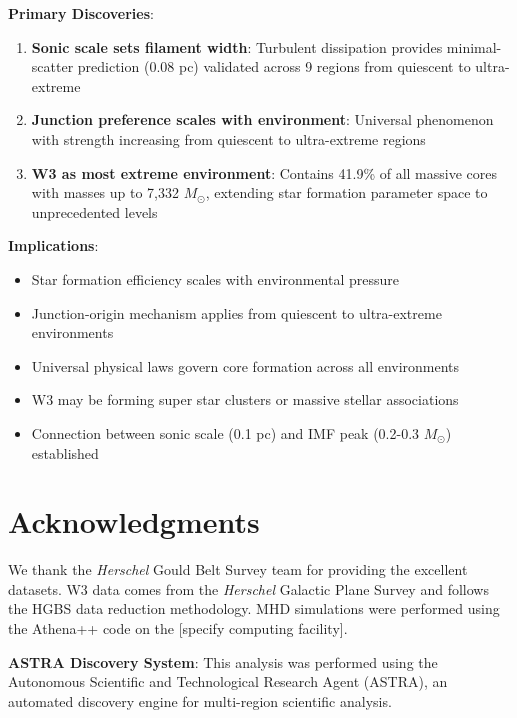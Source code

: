 \documentclass[11pt,a4paper]{article}
\begin{document}
\textbf{Primary Discoveries}:
\begin{enumerate}
    \item \textbf{Sonic scale sets filament width}: Turbulent dissipation provides minimal-scatter prediction (0.08 pc) validated across 9 regions from quiescent to ultra-extreme
    \item \textbf{Junction preference scales with environment}: Universal phenomenon with strength increasing from quiescent to ultra-extreme regions
    \item \textbf{W3 as most extreme environment}: Contains 41.9\% of all massive cores with masses up to 7,332 $M_\odot$, extending star formation parameter space to unprecedented levels
\end{enumerate}

\textbf{Implications}:
\begin{itemize}
    \item Star formation efficiency scales with environmental pressure
    \item Junction-origin mechanism applies from quiescent to ultra-extreme environments
    \item Universal physical laws govern core formation across all environments
    \item W3 may be forming super star clusters or massive stellar associations
    \item Connection between sonic scale (0.1 pc) and IMF peak (0.2-0.3 $M_\odot$) established
\end{itemize}

\section*{Acknowledgments}

We thank the \textit{Herschel} Gould Belt Survey team for providing the excellent datasets. W3 data comes from the \textit{Herschel} Galactic Plane Survey and follows the HGBS data reduction methodology. MHD simulations were performed using the Athena++ code on the [specify computing facility].

\textbf{ASTRA Discovery System}: This analysis was performed using the Autonomous Scientific and Technological Research Agent (ASTRA), an automated discovery engine for multi-region scientific analysis.
\end{document}
